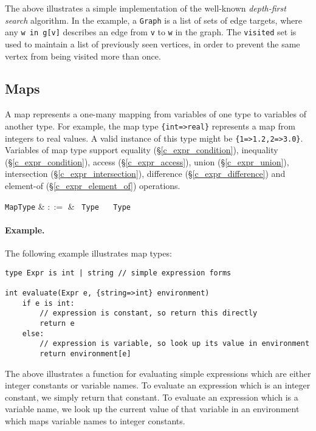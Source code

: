 The above illustrates a simple implementation of the well-known {\em depth-first search} algorithm.  In the example, a \lstinline{Graph} is a list of sets of edge targets, where any \lstinline{w in g[v]} describes an edge from \lstinline{v} to \lstinline{w} in the graph.  The \lstinline{visited} set is used to maintain a list of previously seen vertices, in order to prevent the same vertex from being visited more than once.  


\subsection{Maps}
\label{c_types_map}

A map represents a one-many mapping from variables of one type to variables of another type. For example, the map type \lstinline|{int=>real}| represents a map from integers to real values. A valid instance of this type might be \lstinline|{1=>1.2,2=>3.0}|.  Variables of map type support equality (\S\ref{c_expr_condition}), inequality (\S\ref{c_expr_condition}), access (\S\ref{c_expr_access}), union (\S\ref{c_expr_union}), intersection (\S\ref{c_expr_intersection}), difference (\S\ref{c_expr_difference}) and element-of (\S\ref{c_expr_element_of}) operations.

\begin{syntax}
  \verb+MapType+ & $::=$ & \token{\{} \ \verb+Type+ \ \token{=>} \ \verb+Type+ \ \token{\}} \\
\end{syntax}

\paragraph{Example.} The following example illustrates map types:

\begin{lstlisting}
type Expr is int | string // simple expression forms

int evaluate(Expr e, {string=>int} environment)
    if e is int:
        // expression is constant, so return this directly
        return e
    else:
        // expression is variable, so look up its value in environment
        return environment[e]
\end{lstlisting}

The above illustrates a function for evaluating simple expressions which are either integer constants or variable names.  To evaluate an expression which is an integer constant, we simply return that constant.  To evaluate an expression which is a variable name, we look up the current value of that variable in an environment which maps variable names to integer constants.

